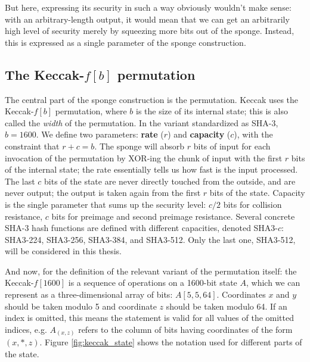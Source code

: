 \documentclass[times, utf8, diplomski]{fer}
\begin{document}
But here, expressing its security in such a way obviously wouldn't make sense:
with an arbitrary-length output, it would mean that we can get an arbitrarily
high level of security merely by squeezing more bits out of the sponge.
Instead, this is expressed as a single parameter of the sponge construction.


\subsection{The Keccak-$f[b]$ permutation}
The central part of the sponge construction is the permutation.
Keccak uses the Keccak-$f[b]$ permutation, where $b$ is the size of its internal
state; this is also called the \emph{width} of the permutation. In the variant
standardized as SHA-3, $b=1600$.
We define two parameters: \textbf{rate} ($r$) and \textbf{capacity} ($c$),
with the constraint that $r + c = b$. The sponge will absorb $r$ bits of input
for each invocation of the permutation by XOR-ing the chunk of input with the
first $r$ bits of the internal state; the rate essentially tells us how fast
is the input processed. The last $c$ bits of the state are never directly
touched from the outside, and are never output; the output is taken again from
the first $r$ bits of the state. Capacity is the single parameter that sums up
the security level: $c/2$ bits for collision resistance, $c$ bits for preimage
and second preimage resistance. Several concrete SHA-3 hash functions are
defined with different capacities, denoted SHA3-$c$: SHA3-224, SHA3-256,
SHA3-384, and SHA3-512. Only the last one, SHA3-512, will be considered in
this thesis.


And now, for the definition of the relevant variant of the permutation itself:
the Keccak-$f[1600]$ is a sequence of operations on a 1600-bit state $A$, which
we can represent as a three-dimensional array of bits: $A[5,5,64]$. Coordinates
$x$ and $y$ should be taken modulo 5 and coordinate $z$ should be taken modulo 64.
If an index is omitted, this means the statement is valid for all values of the
omitted indices, e.g. $A_{(x,z)}$ refers to the column of bits having coordinates
of the form $(x,\ast,z)$. Figure \ref{fig:keccak_state} shows the notation used
for different parts of the state.
\end{document}
